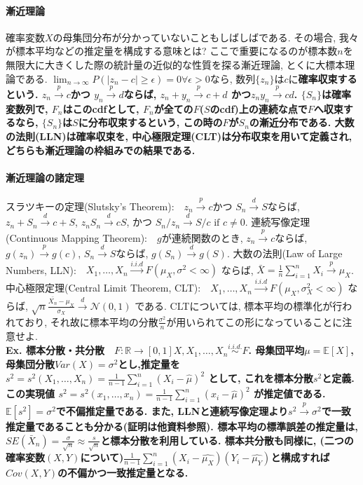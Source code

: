 \documentclass[paper=a4paper,fontsize=10pt]{jlreq}
\begin{document}
\paragraph{漸近理論}
確率変数$X$の母集団分布が分かっていないこともしばしばである. その場合, 我々が標本平均などの推定量を構成する意味とは? ここで重要になるのが標本数$n$を無限大に大きくした際の統計量の近似的な性質を探る漸近理論, とくに大標本理論である. $\lim_{n \to \infty} P(\left\lvert z_n - c \right\rvert \geq \epsilon) = 0　\forall \epsilon>0$なら, 数列$\{z_n\}$は$c$に\rmfamily\mcfamily\bfseries{確率収束}\mdseries するという. $z_n \overset{p}{\to} c$かつ $y_n \overset{p}{\to} d$ならば, $z_n + y_n \overset{p}{\to} c+d$ かつ$z_n y_n \overset{p}{\to} c d$. $\{S_n\}$は確率変数列で, $F_n$はこのcdfとして, $F_n$が全ての$F$($S$のcdf)上の連続な点で$F$へ収束するなら, $\{S_n\}$は$S$に\rmfamily\mcfamily\bfseries{分布収束}\mdseries するという, この時の$F$が$S_n$の\rmfamily\mcfamily\bfseries{漸近分布}\mdseries である. 大数の法則(LLN)は確率収束を, 中心極限定理(CLT)は分布収束を用いて定義され, どちらも漸近理論の枠組みでの結果である.\\

\paragraph{漸近理論の諸定理}
スラツキーの定理(Slutsky's Theorem):　$z_n \overset{p}{\to} c$かつ $S_n \overset{d}{\to} S$ならば, $z_n + S_n \overset{d}{\to} c+S$, $z_n S_n \overset{d}{\to} c S$, かつ $S_n / z_n \overset{d}{\to} S / c \text{ if }c\neq0$. 連続写像定理(Continuous Mapping Theorem):　$g$が連続関数のとき, $z_n \overset{p}{\to} c$ならば, $g(z_n) \overset{p}{\to} g(c)$, $S_n \overset{d}{\to} S$ならば, $g(S_n) \overset{d}{\to} g(S)$. 大数の法則(Law of Large Numbers, LLN):　$X_1,\dots, X_n \overset{i.i.d}{\to} F(\mu_X, \sigma^2<\infty)$ ならば, $\bar{X}=\frac{1}{n}\sum_{i = 1}^{n} X_i \overset{p}{\to} \mu_X $. 中心極限定理(Central Limit Theorem, CLT):　$X_1,\dots, X_n \overset{i.i.d}{\to} F(\mu_X, \sigma_X^2<\infty)$ ならば, $\sqrt{n} \frac{\bar{X_n}-\mu_{X}}{\sigma_X} \overset{d}{\to} \mathcal{N}(0, 1)$ である. CLTについては, 標本平均の標準化が行われており, それ故に標本平均の分散$\frac{\sigma^2}{n}$が用いられてこの形になっていることに注意せよ. \\

\rmfamily\mcfamily\bfseries{Ex. 標本分散・共分散}\mdseries　$F:\mathbb{R}\rightarrow[0, 1]　X, X_1, \dots, X_n \overset{i.i.d.}{\sim}F$. 母集団平均$\mu=\mathbb{E} [X]$, 母集団分散$Var(X)=\sigma^2$とし,\rmfamily\mcfamily\bfseries{推定量}\mdseries を $ s^2 = s^2(X_1, \dots, X_n)=\frac{1}{n-1}\sum_{i = 1}^{n}(X_i-\hat{\mu})^2$ として, これを標本分散$s^2$と定義. この実現値 $ s^2 = s^2(x_1, \dots, x_n)=\frac{1}{n-1}\sum_{i = 1}^{n}(x_i-\hat{\mu})^2$ が推定値である. $\mathbb{E}[s^2]=\sigma^2$で不偏推定量である. また, LLNと連続写像定理より$s^2 \overset{p}{\to} \sigma^2$で一致推定量であることも分かる(証明は他資料参照). 標本平均の標準誤差の推定量は, $SE(\bar{X}_n)=\frac{\sigma}{\sqrt{n}} \approx \frac{s}{\sqrt{n}}$と標本分散を利用している. 標本共分散も同様に, (二つの確率変数$(X,Y)$について)$\frac{1}{n-1}\sum_{i = 1}^{n}(X_i-\hat{\mu_X})(Y_i-\hat{\mu_Y})$と構成すれば$Cov(X,Y)$の不偏かつ一致推定量となる.\\
\end{document}
